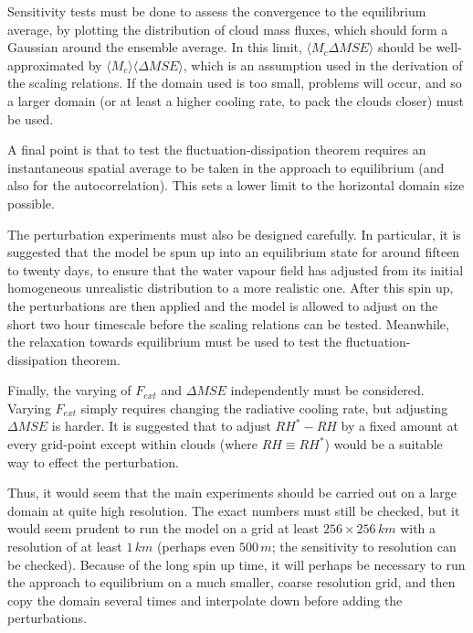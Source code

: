 \documentclass[11pt,a4paper]{article}
\begin{document}
Sensitivity tests must be done to assess the convergence to the
equilibrium average, by plotting the distribution of cloud mass
fluxes, which should form a Gaussian around the ensemble average. In
this limit, $\langle M_c \Delta MSE \rangle$ should be
well-approximated by $\langle M_c \rangle \langle \Delta MSE \rangle$,
which is an assumption used in the derivation of the scaling
relations. If the domain used is too small, problems will occur, and
so a larger domain (or at least a higher cooling rate, to pack the
clouds closer) must be used.

A final point is that to test the fluctuation-dissipation theorem
requires an instantaneous spatial average to be taken in the approach
to equilibrium (and also for the autocorrelation). This sets a lower
limit to the horizontal domain size possible.

The perturbation experiments must also be designed carefully. In
particular, it is suggested that the model be spun up into an
equilibrium state for around fifteen to twenty days, to ensure that
the water vapour field has adjusted from its initial homogeneous unrealistic
distribution to a more realistic one. After this spin up, the
perturbations are then applied and the model is allowed to adjust on
the short two hour timescale before the scaling relations can be
tested. Meanwhile, the relaxation towards equilibrium must be used to
test the fluctuation-dissipation theorem.

Finally, the varying of $F_{ext}$ and $\Delta MSE$ independently must
be considered. Varying $F_{ext}$ simply requires changing the
radiative cooling rate, but adjusting $\Delta MSE$ is harder. It is
suggested that to adjust $RH^* - RH$ by a fixed amount at every
grid-point except within clouds (where $RH \equiv RH^*$) would be a
suitable way to effect the perturbation.

Thus, it would seem that the main experiments should be carried out on
a large domain at quite high resolution. The exact numbers must still
be checked, but it would seem prudent to run the model on a grid at
least $256 \times 256\, km$ with a resolution of at least $1\, km$
(perhaps even $500\, m$; the sensitivity to resolution can be
checked). Because of the long spin up time, it will perhaps be
necessary to run the approach to equilibrium on a much smaller, coarse
resolution grid, and then copy the domain several times and
interpolate down before adding the perturbations.


   
\end{document}
